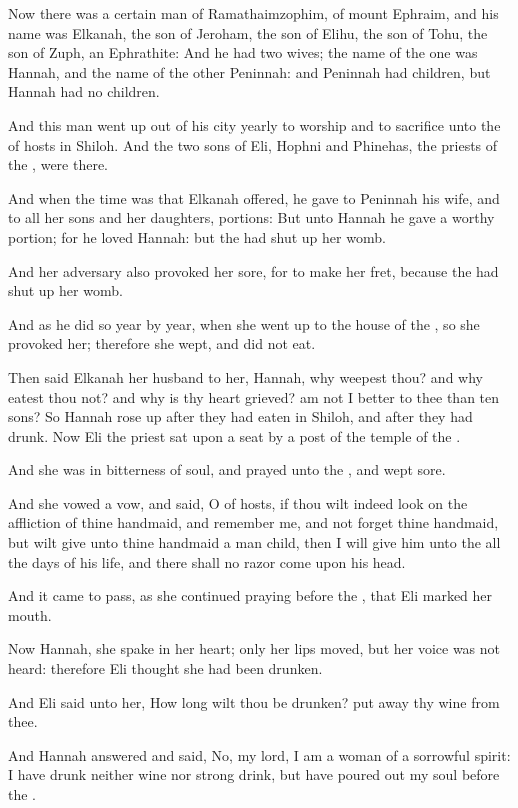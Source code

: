 \Chapter
\Verse Now there was a certain man of Ramathaimzophim, of mount Ephraim, and his name was Elkanah, the son of Jeroham, the son of Elihu, the son of Tohu, the son of Zuph, an Ephrathite: \Verse And he had two wives; the name of the one was Hannah, and the name of the other Peninnah: and Peninnah had children, but Hannah had no children.

\Verse And this man went up out of his city yearly to worship and to sacrifice unto the \LORD of hosts in Shiloh. And the two sons of Eli, Hophni and Phinehas, the priests of the \LORD, were there.

\Verse And when the time was that Elkanah offered, he gave to Peninnah his wife, and to all her sons and her daughters, portions: \Verse But unto Hannah he gave a worthy portion; for he loved Hannah: but the \LORD had shut up her womb.

\Verse And her adversary also provoked her sore, for to make her fret, because the \LORD had shut up her womb.

\Verse And as he did so year by year, when she went up to the house of the \LORD, so she provoked her; therefore she wept, and did not eat.

\Verse Then said Elkanah her husband to her, Hannah, why weepest thou?  and why eatest thou not? and why is thy heart grieved? am not I better to thee than ten sons?  \Verse So Hannah rose up after they had eaten in Shiloh, and after they had drunk. Now Eli the priest sat upon a seat by a post of the temple of the \LORD.

\Verse And she was in bitterness of soul, and prayed unto the \LORD, and wept sore.

\Verse And she vowed a vow, and said, O \LORD of hosts, if thou wilt indeed look on the affliction of thine handmaid, and remember me, and not forget thine handmaid, but wilt give unto thine handmaid a man child, then I will give him unto the \LORD all the days of his life, and there shall no razor come upon his head.

\Verse And it came to pass, as she continued praying before the \LORD, that Eli marked her mouth.

\Verse Now Hannah, she spake in her heart; only her lips moved, but her voice was not heard: therefore Eli thought she had been drunken.

\Verse And Eli said unto her, How long wilt thou be drunken? put away thy wine from thee.

\Verse And Hannah answered and said, No, my lord, I am a woman of a sorrowful spirit: I have drunk neither wine nor strong drink, but have poured out my soul before the \LORD.

